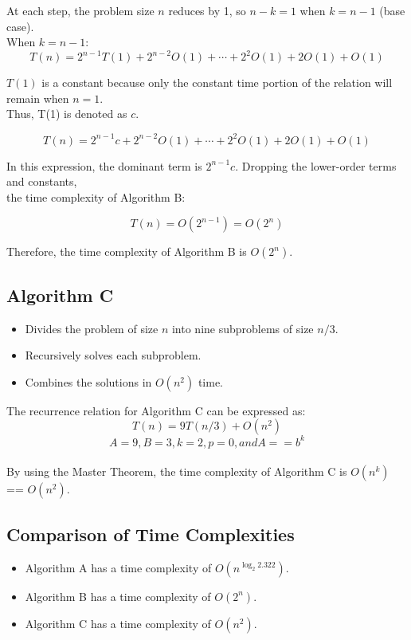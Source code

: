 \documentclass{article}
\begin{document}
At each step, the problem size \( n \) reduces by 1, so \( n - k = 1 \) when \( k = n - 1 \) (base case).\\

When \( k = n - 1 \):
\[ T(n) = 2^{n-1} T(1) + 2^{n-2} O(1) + \cdots + 2^2 O(1) + 2O(1) + O(1) \]

\( T(1) \) is a constant because only the constant time portion of the relation will remain when \( n = 1 \). \\

Thus, T(1) is denoted as \( c \).

\[ T(n) = 2^{n-1} c + 2^{n-2} O(1) + \cdots + 2^2 O(1) + 2O(1) + O(1) \]

In this expression, the dominant term is \( 2^{n-1} c \). Dropping the lower-order terms and constants, \\

the time complexity of Algorithm B:

\[ T(n) = O(2^{n-1}) = O(2^n) \]

Therefore, the time complexity of Algorithm B is \( O(2^n) \).

\subsection*{Algorithm C}
\begin{itemize}
    \item Divides the problem of size \( n \) into nine subproblems of size \( n/3 \).
    \item Recursively solves each subproblem.
    \item Combines the solutions in \( O(n^2) \) time.
\end{itemize}

The recurrence relation for Algorithm C can be expressed as:
\[
    T(n) = 9T(n/3) + O(n^2)
\]
\[ A = 9, B = 3, k = 2, p = 0, and A == b^{k}\]\\


By using the Master Theorem, the time complexity of Algorithm C is \( O(n^{k}) \) == \( O(n^2) \).

\subsection*{Comparison of Time Complexities}
\begin{itemize}
    \item Algorithm A has a time complexity of \( O(n^{\log_2{2.322}}) \).
    \item Algorithm B has a time complexity of \( O(2^n) \).
    \item Algorithm C has a time complexity of \( O(n^2) \).
\end{itemize}
\end{document}
